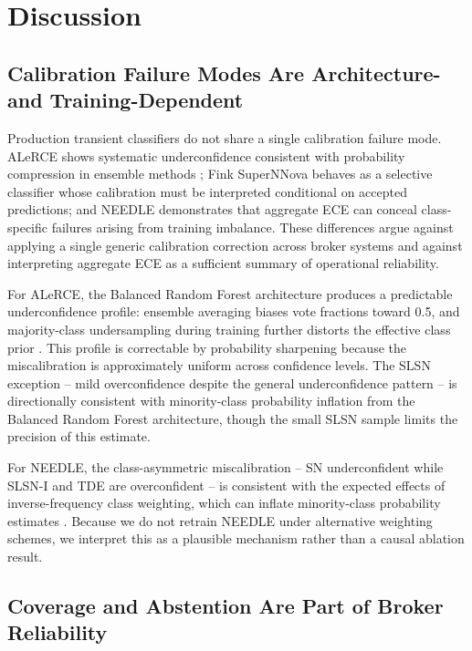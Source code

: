 \documentclass[a4paper,fleqn,usenatbib]{mnras}
\begin{document}
\section{Discussion} \label{sec:discussion}

\subsection{Calibration Failure Modes Are Architecture- and
Training-Dependent}\label{sec:disc_architecture}

Production transient classifiers do not share a single calibration
failure mode. ALeRCE shows systematic underconfidence consistent
with probability compression in ensemble methods
\citep{niculescumizil2005, bostrom2008}; Fink SuperNNova behaves
as a selective classifier whose calibration must be interpreted
conditional on accepted predictions; and NEEDLE demonstrates that
aggregate ECE can conceal class-specific failures arising from
training imbalance. These differences argue against applying a
single generic calibration correction across broker systems and
against interpreting aggregate ECE as a sufficient summary of
operational reliability.

For ALeRCE, the Balanced Random Forest architecture produces a
predictable underconfidence profile: ensemble averaging biases
vote fractions toward 0.5, and majority-class undersampling during
training further distorts the effective class prior
\citep{vandengoorbergh2022}. This profile is correctable by
probability sharpening because the miscalibration is approximately
uniform across confidence levels. The SLSN exception -- mild
overconfidence despite the general underconfidence pattern -- is
directionally consistent with minority-class probability inflation
from the Balanced Random Forest architecture, though the small
SLSN sample limits the precision of this estimate.

For NEEDLE, the class-asymmetric miscalibration -- SN underconfident
while SLSN-I and TDE are overconfident -- is consistent with the
expected effects of inverse-frequency class weighting, which can
inflate minority-class probability estimates
\citep{vandengoorbergh2022}. Because we do not retrain NEEDLE
under alternative weighting schemes, we interpret this as a
plausible mechanism rather than a causal ablation result.

\subsection{Coverage and Abstention Are Part of Broker
Reliability}\label{sec:disc_coverage}
\end{document}
